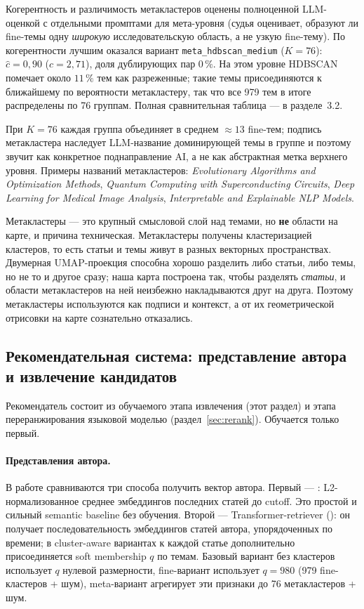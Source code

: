 Когерентность и различимость метакластеров оценены полноценной LLM-оценкой с отдельными
промптами для мета-уровня (судья оценивает, образуют ли fine-темы одну \emph{широкую}
исследовательскую область, а не узкую fine-тему). По когерентности лучшим оказался вариант
\texttt{meta\_hdbscan\_medium} ($K = 76$): $\hat{c} = 0{,}90$ ($c = 2{,}71$), доля дублирующих пар
$0\,\%$. На этом уровне HDBSCAN помечает около $11\,\%$ тем как разреженные; такие темы
присоединяются к ближайшему по вероятности метакластеру, так что все 979 тем в итоге распределены
по 76 группам. Полная сравнительная таблица — в разделе~3.2.

При $K = 76$ каждая группа объединяет в среднем $\approx 13$ fine-тем; подпись метакластера
наследует LLM-название доминирующей темы в группе и поэтому звучит как конкретное поднаправление
AI, а не как абстрактная метка верхнего уровня. Примеры названий метакластеров:
\emph{Evolutionary Algorithms and Optimization Methods},
\emph{Quantum Computing with Superconducting Circuits},
\emph{Deep Learning for Medical Image Analysis},
\emph{Interpretable and Explainable NLP Models}.

Метакластеры — это крупный смысловой слой над темами, но \textbf{не} области на карте, и причина
техническая. Метакластеры получены кластеризацией кластеров, то есть статьи и темы живут в разных
векторных пространствах. Двумерная UMAP-проекция способна хорошо разделить либо статьи, либо темы,
но не то и другое сразу; наша карта построена так, чтобы разделять \emph{статьи}, и области
метакластеров на ней неизбежно накладываются друг на друга. Поэтому метакластеры используются как
подписи и контекст, а от их геометрической отрисовки на карте сознательно отказались.

\subsection{Рекомендательная система: представление автора и извлечение кандидатов}
\label{sec:retrieval}

Рекомендатель состоит из обучаемого этапа извлечения (этот раздел) и этапа переранжирования
языковой моделью (раздел~\ref{sec:rerank}). Обучается только первый.

\paragraph{Представления автора.} В работе сравниваются три способа получить вектор автора.
Первый — : L2-нормализованное среднее эмбеддингов последних статей
до cutoff. Это простой и сильный semantic baseline без обучения. Второй — Transformer-retriever
(): он получает последовательность эмбеддингов статей автора,
упорядоченных по времени; в cluster-aware вариантах к каждой статье дополнительно присоединяется
soft membership $q$ по темам. Базовый вариант без кластеров использует $q$ нулевой размерности,
fine-вариант использует $q = 980$ (979 fine-кластеров + шум), meta-вариант агрегирует эти признаки
до 76 метакластеров + шум.

